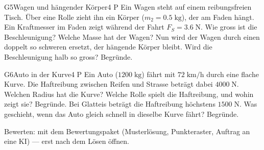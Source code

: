 \documentclass[11pt]{article}
\begin{document}

\begin{lpaufgabe}{G5}{Wagen und hängender Körper}{4 P}
Ein Wagen steht auf einem reibungsfreien Tisch. Über eine Rolle zieht ihn ein Körper ($m_2 = 0.5\;\text{kg}$), der am Faden hängt.
Ein Kraftmesser im Faden zeigt während der Fahrt $F_S = 3.6\;\text{N}$. Wie gross ist die Beschleunigung? Welche Masse hat der Wagen?
Nun wird der Wagen durch einen doppelt so schweren ersetzt, der hängende Körper bleibt. Wird die Beschleunigung halb so gross? Begründe.
\end{lpaufgabe}


\begin{lpaufgabe}{G6}{Auto in der Kurve}{4 P}
Ein Auto ($1200\;\text{kg}$) fährt mit $72\;\text{km/h}$ durch eine flache Kurve. Die Haftreibung zwischen Reifen und Strasse beträgt dabei $4000\;\text{N}$.
Welchen Radius hat die Kurve? Welche Rolle spielt die Haftreibung, und wohin zeigt sie? Begründe.
Bei Glatteis beträgt die Haftreibung höchstens $1500\;\text{N}$. Was geschieht, wenn das Auto gleich schnell in dieselbe Kurve fährt? Begründe.
\end{lpaufgabe}

\vfill
{\small\color{lpgrau}Bewerten: mit dem Bewertungspaket (Musterlösung, Punkteraster, Auftrag an eine KI) — erst nach dem Lösen öffnen.}
\end{document}
